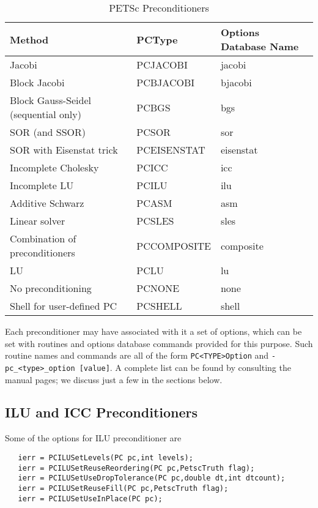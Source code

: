 \begin{table}
\begin{center}
\begin{tabular}{lll}
{\bf Method}    &{\bf PCType}   & {\bf Options Database Name}\\
\hline
Jacobi                               & PCJACOBI      & jacobi\\
Block Jacobi                         & PCBJACOBI     & bjacobi\\
Block Gauss-Seidel (sequential only) & PCBGS         & bgs\\
SOR (and SSOR)                       & PCSOR         & sor\\
SOR with Eisenstat trick             & PCEISENSTAT   & eisenstat\\
Incomplete Cholesky                  & PCICC         & icc\\
Incomplete LU                        & PCILU         & ilu\\
Additive Schwarz                     & PCASM         & asm\\
Linear solver                        & PCSLES        & sles \\
Combination of preconditioners       & PCCOMPOSITE   & composite \\
\hline
LU                                   & PCLU          & lu\\
No preconditioning                   & PCNONE        & none\\
Shell for user-defined PC            & PCSHELL       & shell\\
\hline
\end{tabular}
\end{center}
\caption{PETSc Preconditioners}
\label{tab:pcdefaults}
\end{table}

Each preconditioner may have associated with it a set of options,
which can be set with routines and options database commands provided
for this purpose.  Such routine names and commands are all of the form
{\tt PC<TYPE>Option} and {\tt -pc\_<type>\_option [value]}.  A
complete list can be found by consulting the manual pages; we discuss
just a few in the sections below.

\subsection{ILU and ICC Preconditioners}
\label{sec:ilu_icc}

Some of the options for ILU preconditioner are 
\begin{verbatim}
   ierr = PCILUSetLevels(PC pc,int levels);
   ierr = PCILUSetReuseReordering(PC pc,PetscTruth flag);
   ierr = PCILUSetUseDropTolerance(PC pc,double dt,int dtcount);
   ierr = PCILUSetReuseFill(PC pc,PetscTruth flag);
   ierr = PCILUSetUseInPlace(PC pc); 
\end{verbatim}
 
 

